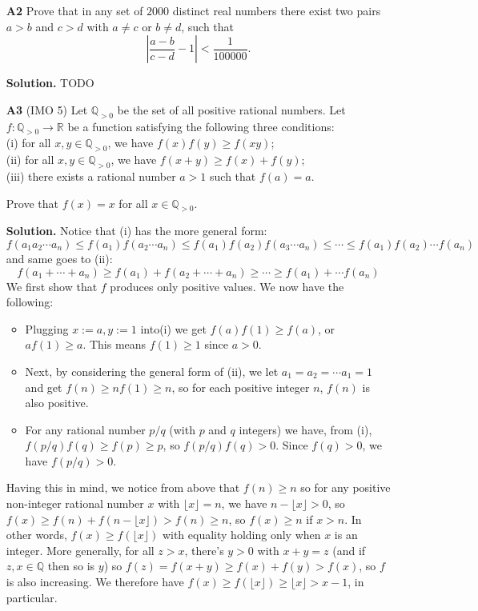 \documentclass[11pt,a4paper]{article}
\begin{document}
\begin{enumerate}
	\item [\textbf{A2}] Prove that in any set of $2000$ distinct real numbers there exist two pairs $a>b$ and $c>d$ with $a \neq c$ or $b \neq d $, such that \[ \left| \frac{a-b}{c-d} - 1 \right|< \frac{1}{100000}. \]
	
	\textbf{Solution.} TODO
	
	\item [\textbf{A3}] (IMO 5)
	Let $\mathbb Q_{>0}$ be the set of all positive rational numbers. Let $f:\mathbb Q_{>0}\to\mathbb R$ be a function satisfying the following three conditions:\\
	(i) for all $x,y\in\mathbb Q_{>0}$, we have $f(x)f(y)\geq f(xy)$;\\
	(ii) for all $x,y\in\mathbb Q_{>0}$, we have $f(x+y)\geq f(x)+f(y)$;\\
	(iii) there exists a rational number $a>1$ such that $f(a)=a$.
	
	Prove that $f(x)=x$ for all $x\in\mathbb Q_{>0}$.
	
	\textbf{Solution.} 
	Notice that (i) has the more general form: 
	\[
	f(a_1a_2\cdots a_n)
	\le f(a_1)f(a_2\cdots a_n)
	\le f(a_1)f(a_2)f(a_3\cdots a_n)
	\le\cdots
	\le f(a_1)f(a_2)\cdots f(a_n)
	\]
	and same goes to (ii):
	\[
	f(a_1+\cdots + a_n)
	\ge f(a_1)+f(a_2+\cdots + a_n)
	\ge
	\cdots
	\ge f(a_1)+\cdots f(a_n)
	\]
	We first show that $f$ produces only positive values. We now have the following:
	\begin{itemize}
		\item Plugging $x:=a, y:=1$ into(i) we get $f(a)f(1)\ge f(a)$, or $af(1)\ge a$. This means $f(1)\ge 1$ since $a>0$. 
		
		\item Next, by considering the general form of (ii), we let $a_1=a_2=\cdots a_1=1$ and get $f(n)\ge nf(1)\ge n$, so for each positive integer $n$, $f(n)$ is also positive. 
		
		\item For any rational number $p/q$ (with $p$ and $q$ integers) we have, from (i), $f(p/q)f(q)\ge f(p)\ge p$, so $f(p/q)f(q)>0$. 
		Since $f(q)>0$, we have $f(p/q)>0$. 
		
	\end{itemize}
	
	Having this in mind, we notice from above that $f(n)\ge n$ so for any positive non-integer rational number $x$ with $\lfloor x\rfloor=n$, we have $n-\lfloor x\rfloor>0$, so $f(x)\ge f(n)+f(n-\lfloor x\rfloor)>f(n)\ge n$, so $f(x)\ge n$ if $x>n$. 
	In other words, $f(x)\ge f(\lfloor x\rfloor)$ with equality holding only when $x$ is an integer. 
	More generally, for all $z>x$, there's $y>0$ with $x+y=z$ (and if $z, x\in\mathbb{Q}$ then so is $y$) so $f(z)=f(x+y)\ge f(x)+f(y)>f(x)$, so $f$ is also increasing. 
	We therefore have $f(x)\ge f(\lfloor x\rfloor)\ge \lfloor x\rfloor>x-1$, in particular. 
	

\end{enumerate}
\end{document}
